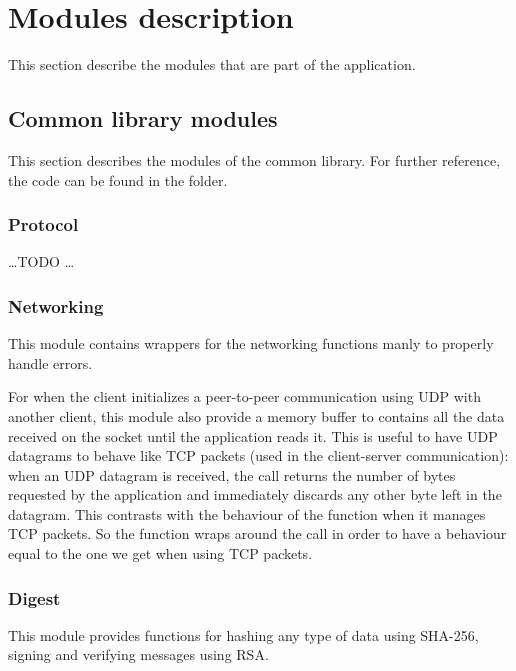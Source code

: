 \section{Modules description}\label{sec:modules}

This section describe the modules that are part of the application.


\subsection{Common library modules}\label{subsec:commonmod}

This section describes the modules of the common library. For further reference,
the code can be found in the  folder.

\subsubsection{Protocol}

\ldots TODO \ldots

\subsubsection{Networking}

This module contains wrappers for the networking functions  manly to properly handle
errors.

For when the client initializes a peer-to-peer communication using UDP with
another client, this module also provide a memory buffer to contains all the
data received on the socket until the application reads it. This is useful to
have UDP datagrams to behave like TCP packets (used in the client-server
communication): when an UDP datagram is received, the  call
returns the number of bytes requested by the application and immediately
discards any other byte left in the datagram. This contrasts with the behaviour
of the  function when it manages TCP packets. So the
 function wraps around the  call in order
to have a behaviour equal to the one we get when using TCP packets.

\subsubsection{Digest}

This module provides functions for hashing any type of data using SHA-256,
signing and verifying messages using RSA\@.

